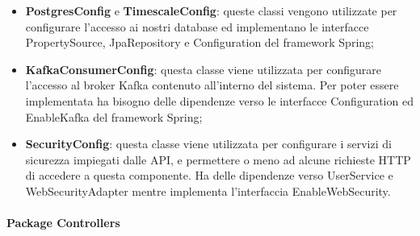 		\begin{itemize}
			\item \textbf{PostgresConfig} e \textbf{TimescaleConfig}: queste classi vengono utilizzate per configurare l'accesso ai nostri database ed implementano le interfacce PropertySource, JpaRepository e Configuration del framework Spring;
			\item \textbf{KafkaConsumerConfig}: questa classe viene utilizzata per configurare l'accesso al broker Kafka contenuto all'interno del sistema. Per poter essere implementata ha bisogno delle dipendenze verso le interfacce Configuration ed EnableKafka del framework Spring;
			\item \textbf{SecurityConfig}: questa classe viene utilizzata per configurare i servizi di sicurezza impiegati dalle API, e permettere o meno ad alcune richieste HTTP di accedere a questa componente. Ha delle dipendenze verso UserService e WebSecurityAdapter mentre implementa l'interfaccia EnableWebSecurity.
		\end{itemize}
		\newpage
		\paragraph*{Package Controllers}


